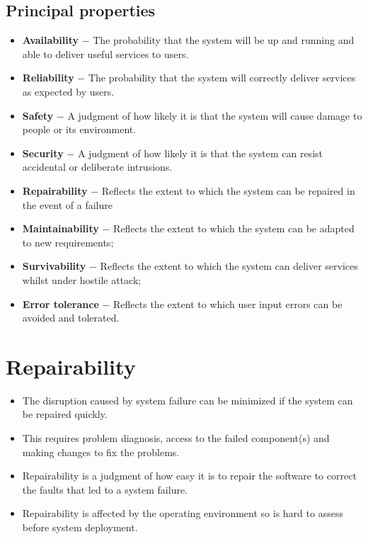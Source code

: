 \subsection{Principal properties}
\begin{itemize}
\item \textbf{Availability}
$-$ The probability that the system will be up and running and able to deliver useful services to users.

\item \textbf{Reliability}
$-$ The probability that the system will correctly deliver services as expected by users.

\item \textbf{Safety}
$-$ A judgment of how likely it is that the system will cause damage to people or its environment.

\item \textbf{Security}
$-$ A judgment of how likely it is that the system can resist accidental or deliberate intrusions.

\item \textbf{Repairability}
$-$ Reflects the extent to which the system can be repaired in the event of a failure

\item \textbf{Maintainability}
$-$ Reflects the extent to which the system can be adapted to new requirements;

\item \textbf{Survivability}
$-$ Reflects the extent to which the system can deliver services whilst under hostile attack;

\item \textbf{Error tolerance}
$-$ Reflects the extent to which user input errors can be avoided and tolerated.

\end{itemize}

\section{Repairability}
\begin{itemize}
\item The disruption caused by system failure can be minimized if the system can be repaired quickly.
\item This requires problem diagnosis, access to the failed component(s) and making changes to fix the problems.
\item Repairability is a judgment of how easy it is to repair the software to correct the faults that led to a system failure.
\item Repairability is affected by the operating environment so is hard to assess before system deployment.
\end{itemize}

